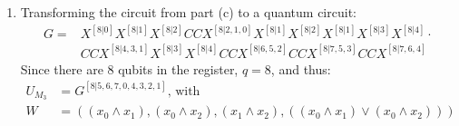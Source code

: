 \documentclass[11pt,a4paper]{article}
\begin{document}
\begin{enumerate}
\begin{enumerate}
              \item Transforming the circuit from part (c) to a quantum circuit:
                    \begin{align*}
                        G = & X^{[8|0]} X^{[8|1]} X^{[8|2]} CCX^{[8|2, 1, 0]} X^{[8|1]} X^{[8|2]} X^{[8|1]} X^{[8|3]} X^{[8|4]} \cdot \\
                            & CCX^{[8|4, 3, 1]} X^{[8|3]} X^{[8|4]} CCX^{[8|6, 5, 2]} CCX^{[8|7, 5, 3]} CCX^{[8|7, 6, 4]}
                    \end{align*}
                    Since there are 8 qubits in the register, $q = 8$, and thus:
                    \begin{align*}
                        U_{M_3} & = G^{[8|5, 6, 7, 0, 4, 3, 2, 1]} \text{, with}                                                \\
                        W       & = ((x_0 \land x_1), (x_0 \land x_2), (x_1 \land x_2), ((x_0 \land x_1) \lor (x_0 \land x_2)))
                    \end{align*}
          \end{enumerate}
          \newpage


\end{enumerate}
\end{document}
